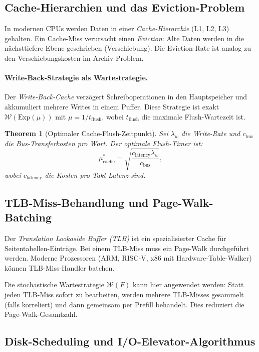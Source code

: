 ﻿\documentclass[12pt, a4paper]{article}
\newtheorem{theorem}{Theorem}[section]
\newcommand{\Exp}{\mathrm{Exp}}
\begin{document}
\subsection{Cache-Hierarchien und das Eviction-Problem}

In modernen CPUs werden Daten in einer \emph{Cache-Hierarchie} (L1, L2, L3)
gehalten. Ein Cache-Miss verursacht einen \emph{Eviction}: Alte Daten werden
in die nächsttiefere Ebene geschrieben (Verschiebung). Die Eviction-Rate ist
analog zu den Verschiebungskosten im Archiv-Problem.

\paragraph{Write-Back-Strategie als Wartestrategie.}
Der \emph{Write-Back-Cache} verzögert Schreiboperationen in den Hauptspeicher
und akkumuliert mehrere Writes in einem Puffer. Diese Strategie ist exakt
$\mathcal{W}(\Exp(\mu))$ mit $\mu = 1/t_{\mathrm{flush}}$, wobei
$t_{\mathrm{flush}}$ die maximale Flush-Wartezeit ist.

\begin{theorem}[Optimaler Cache-Flush-Zeitpunkt]\label{thm:cacheflush}
Sei $\lambda_w$ die Write-Rate und $c_{\mathrm{bus}}$ die Bus-Transferkosten
pro Wort. Der optimale Flush-Timer ist:
\[
  \mu^*_{\mathrm{cache}} = \sqrt{\frac{c_{\mathrm{latency}} \lambda_w}{c_{\mathrm{bus}}}},
\]
wobei $c_{\mathrm{latency}}$ die Kosten pro Takt Latenz sind.
\end{theorem}

\subsection{TLB-Miss-Behandlung und Page-Walk-Batching}

Der \emph{Translation Lookaside Buffer (TLB)} ist ein spezialisierter Cache
für Seitentabellen-Einträge. Bei einem TLB-Miss muss ein Page-Walk durchgeführt
werden. Moderne Prozessoren (ARM, RISC-V, x86 mit Hardware-Table-Walker)
können TLB-Miss-Handler batchen.

Die stochastische Wartestrategie $\mathcal{W}(F)$ kann hier angewendet werden:
Statt jeden TLB-Miss sofort zu bearbeiten, werden mehrere TLB-Misses gesammelt
(falls korreliert) und dann gemeinsam per Prefill behandelt. Dies reduziert die
Page-Walk-Gesamtzahl.

\subsection{Disk-Scheduling und I/O-Elevator-Algorithmus}
\end{document}
